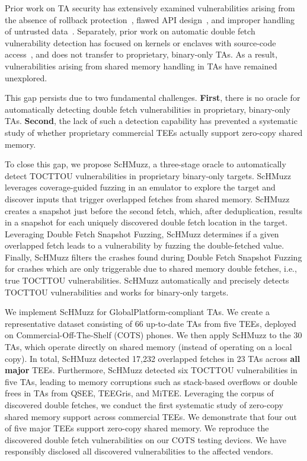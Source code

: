\documentclass[letterpaper,twocolumn,10pt]{article}
\newcommand{\sysname}{ScHMuzz\xspace}
\newcommand{\stagetwo}{Double Fetch Snapshot Fuzzing\xspace}
\newcommand{\mitee}{MiTEE\xspace}
\newcommand{\teegris}{TEEGris\xspace}
\newcommand{\qsee}{QSEE\xspace}
\newcommand{\numTAs}{66\xspace}
\newcommand{\numTAsharnessed}{30\xspace}
\newcommand{\numTEEs}{five\xspace}
\newcommand{\numTAsdf}{23\xspace}
\newcommand{\numdfsmerge}{17,232\xspace}
\newcommand{\numvulns}{six\xspace}
\newcommand{\numvulnTAs}{five\xspace}
\begin{document}
Prior work on TA security has extensively examined vulnerabilities arising from 
the absence of rollback protection~\cite{rollback}, flawed API design~\cite{globalconfusion}, 
and improper handling of untrusted data~\cite{AdamskiGuilbonPeterlin2019SamsungTrustZone,teezz,trustdies}. 
Separately, prior work on automatic double fetch vulnerability detection has focused on kernels 
or enclaves with source-code access~\cite{decaf,deadline,wang2017double,chen2024enclavefuzz}, 
and does not transfer to proprietary, binary-only TAs. 
As a result, vulnerabilities arising from shared memory handling in TAs have remained unexplored.

This gap persists due to two fundamental challenges. \textbf{First}, there is no oracle for
automatically detecting double fetch vulnerabilities in proprietary, binary-only TAs.
\textbf{Second}, the lack of such a detection capability has prevented a systematic study of
whether proprietary commercial TEEs actually support zero-copy shared memory. 

To close this gap, we propose \sysname, a three-stage oracle to 
automatically detect TOCTTOU vulnerabilities in proprietary binary-only targets. 
\sysname leverages coverage-guided fuzzing in an emulator to explore the target and 
discover inputs that trigger overlapped fetches from shared memory. \sysname creates 
a snapshot just before the second fetch, which, after deduplication, results in a 
snapshot for each uniquely discovered double fetch location in the target.
Leveraging \stagetwo, \sysname determines if a given overlapped fetch leads 
to a vulnerability by fuzzing the double-fetched value. 
Finally, \sysname filters the crashes found during \stagetwo 
for crashes which are only triggerable due to shared memory double fetches, i.e., true 
TOCTTOU vulnerabilities. \sysname automatically 
and precisely detects TOCTTOU vulnerabilities and works for binary-only 
targets.

We implement \sysname for GlobalPlatform-compliant TAs. We create a representative dataset consisting of 
\numTAs{} up-to-date TAs from \numTEEs{} TEEs, deployed on Commercial-Off-The-Shelf (COTS) phones. 
We then apply \sysname to the \numTAsharnessed{} TAs, which operate directly on shared memory (instead of 
operating on a local copy).
In total, \sysname detected \numdfsmerge{} overlapped fetches in \numTAsdf TAs across \textbf{all major} TEEs. 
Furthermore, \sysname detected 
\numvulns{} TOCTTOU vulnerabilities in \numvulnTAs{} TAs, leading to memory corruptions such as 
stack-based overflows or double frees in TAs from \qsee, \teegris, and \mitee. 
Leveraging the corpus of discovered double fetches, we conduct the first systematic study of 
zero-copy shared memory support across commercial TEEs. 
We demonstrate that four out of five major TEEs support zero-copy shared memory.
We reproduce the discovered double fetch vulnerabilities on our COTS testing devices. 
We have responsibly disclosed all discovered vulnerabilities to the affected vendors.
\end{document}
